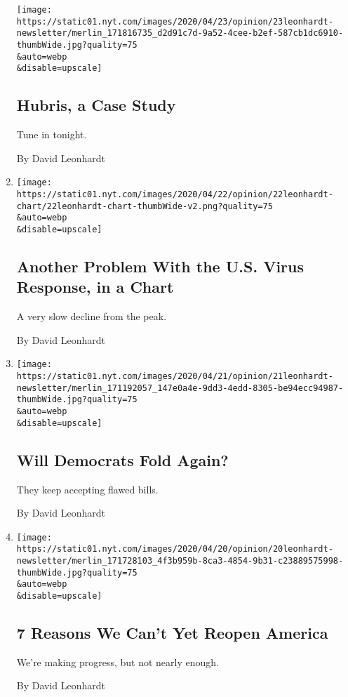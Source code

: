 \begin{enumerate}
  \texttt{[image: https://static01.nyt.com/images/2020/04/23/opinion/23leonhardt-newsletter/merlin\_171816735\_d2d91c7d-9a52-4cee-b2ef-587cb1dc6910-thumbWide.jpg?quality=75\\\&auto=webp\\\&disable=upscale]}

  \hypertarget{hubris-a-case-study}{%
  \subsection{Hubris, a Case Study}\label{hubris-a-case-study}}

  Tune in tonight.

  By David Leonhardt
\item
  \href{/2020/04/22/opinion/coronavirus-us-cases.html}{}

  \texttt{[image: https://static01.nyt.com/images/2020/04/22/opinion/22leonhardt-chart/22leonhardt-chart-thumbWide-v2.png?quality=75\\\&auto=webp\\\&disable=upscale]}

  \hypertarget{another-problem-with-the-us-virus-response-in-a-chart}{%
  \subsection{Another Problem With the U.S. Virus Response, in a
  Chart}\label{another-problem-with-the-us-virus-response-in-a-chart}}

  A very slow decline from the peak.

  By David Leonhardt
\item
  \href{/2020/04/21/opinion/coronavirus-stimulus-democrats.html}{}

  \texttt{[image: https://static01.nyt.com/images/2020/04/21/opinion/21leonhardt-newsletter/merlin\_171192057\_147e0a4e-9dd3-4edd-8305-be94ecc94987-thumbWide.jpg?quality=75\\\&auto=webp\\\&disable=upscale]}

  \hypertarget{will-democrats-fold-again}{%
  \subsection{Will Democrats Fold
  Again?}\label{will-democrats-fold-again}}

  They keep accepting flawed bills.

  By David Leonhardt
\item
  \href{/2020/04/20/opinion/coronavirus-reopen-economy.html}{}

  \texttt{[image: https://static01.nyt.com/images/2020/04/20/opinion/20leonhardt-newsletter/merlin\_171728103\_4f3b959b-8ca3-4854-9b31-c23889575998-thumbWide.jpg?quality=75\\\&auto=webp\\\&disable=upscale]}

  \hypertarget{7-reasons-we-cant-yet-reopen-america}{%
  \subsection{7 Reasons We Can't Yet Reopen
  America}\label{7-reasons-we-cant-yet-reopen-america}}

  We're making progress, but not nearly enough.

  By David Leonhardt
\end{enumerate}


